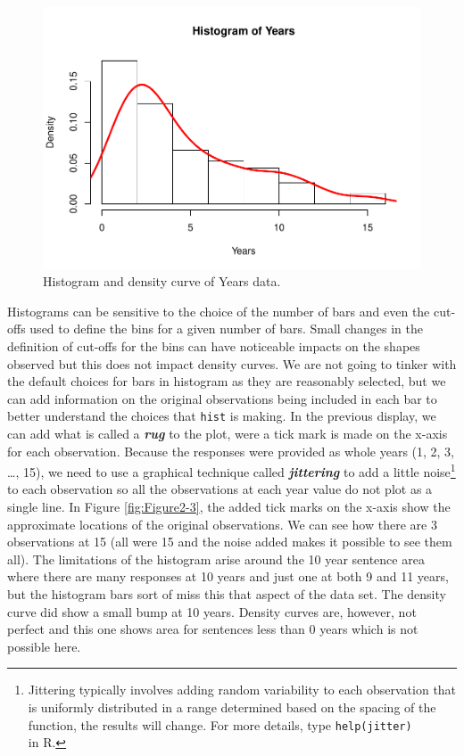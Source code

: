 \documentclass[]{book}
\let\rmarkdownfootnote\footnote%
\def\footnote{\protect\rmarkdownfootnote}
\begin{document}
\begin{figure}
\centering
\includegraphics{GreenwoodBanner_files/figure-latex/Figure2-2-1.pdf}
\caption{\label{fig:Figure2-2}Histogram and density curve of Years data.}
\end{figure}

Histograms can be sensitive to the choice of the number of bars and even
the cut-offs used to define the bins for a given number of bars. Small
changes in the definition of cut-offs for the bins can have noticeable
impacts on the shapes observed but this does not impact density curves.
We are not going to tinker with the default choices for bars in
histogram as they are reasonably selected, but we can add information on
the original observations being included in each bar to better
understand the choices that \texttt{hist} is making. In the previous
display, we can add what is called a \textbf{\emph{rug}} to the plot,
were a tick mark is made on the x-axis for each observation. Because the
responses were provided as whole years (1, 2, 3, \ldots{}, 15), we need
to use a graphical technique called \textbf{\emph{jittering}} to add a
little noise\footnote{Jittering typically involves adding random
  variability to each observation that is uniformly distributed in a
  range determined based on the spacing of the function, the results
  will change. For more details, type \texttt{help(jitter)}\\
  in R.} to each observation so all the observations at each year value
do not plot as a single line. In Figure \ref{fig:Figure2-3}, the added
tick marks on the x-axis show the approximate locations of the original
observations. We can see how there are 3 observations at 15 (all were 15
and the noise added makes it possible to see them all). The limitations
of the histogram arise around the 10 year sentence area where there are
many responses at 10 years and just one at both 9 and 11 years, but the
histogram bars sort of miss this that aspect of the data set. The
density curve did show a small bump at 10 years. Density curves are,
however, not perfect and this one shows area for sentences less than 0
years which is not possible here.
\end{document}
